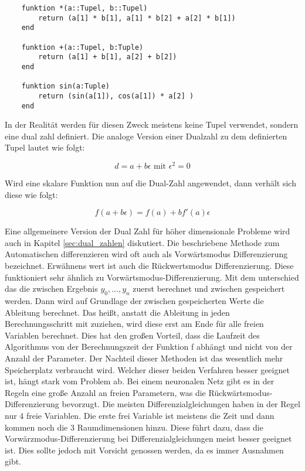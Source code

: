 \begin{lstlisting}
	funktion *(a::Tupel, b::Tupel)
    	return (a[1] * b[1], a[1] * b[2] + a[2] * b[1]) 
    end
    
    funktion +(a::Tupel, b:Tuple)
    	return (a[1] + b[1], a[2] + b[2])
    end
    
    funktion sin(a:Tuple)
    	return (sin(a[1]), cos(a[1]) * a[2] ) 
    end
\end{lstlisting}

In der Realität werden für diesen Zweck meistens keine Tupel verwendet, sondern eine dual zahl definiert.
Die analoge Version einer Dualzahl zu dem definierten Tupel lautet wie folgt:

\begin{equation}
	d = a + b \epsilon \text{ mit } \epsilon^2 = 0
\end{equation}

Wird eine skalare Funktion nun auf die Dual-Zahl angewendet, dann verhält sich diese wie folgt:

\begin{equation}
	f( a + b \epsilon) = f(a) + b f'(a) \epsilon
\end{equation}

Eine allgemeinere Version der Dual Zahl für höher dimensionale Probleme wird auch in Kapitel \ref{sec:dual_zahlen} diskutiert.
Die beschriebene Methode zum Automatischen differenzieren wird oft auch als Vorwärtsmodus Differenzierung bezeichnet.
Erwähnens wert ist auch die Rückwertsmodus Differenzierung.
Diese funktioniert sehr ähnlich zu Vorwärtsmodus-Differenzierung.
Mit dem unterschied das die zwischen Ergebnis $y_0, ... , y_n$ zuerst berechnet und zwischen gespeichert werden.
Dann wird auf Grundlage der zwischen gespeicherten Werte die Ableitung berechnet.
Das heißt, anstatt die Ableitung in jeden Berechnungsschritt mit zuziehen, wird diese erst am Ende für alle freien Variablen berechnet.
Dies hat den großen Vorteil, dass die Laufzeit des Algorithmus von der Berechnungszeit der Funktion f abhängt und nicht von der Anzahl der Parameter.
Der Nachteil dieser Methoden ist das wesentlich mehr Speicherplatz verbraucht wird.
Welcher dieser beiden Verfahren besser geeignet ist, hängt stark vom Problem ab.
Bei einem neuronalen Netz gibt es in der Regeln eine große Anzahl an freien Parametern, was die Rückwärtsmodus-Differenzierung bevorzugt.
Die meisten Differenzialgleichungen haben in der Regel nur 4 freie Variablen.
Die erste frei Variable ist meistens die Zeit und dann kommen noch die 3 Raumdimensionen hinzu.
Diese führt dazu, dass die Vorwärzmodus-Differenzierung bei Differenzialgleichungen meist besser geeignet ist.
Dies sollte jedoch mit Vorsicht genossen werden, da es immer Ausnahmen gibt.
